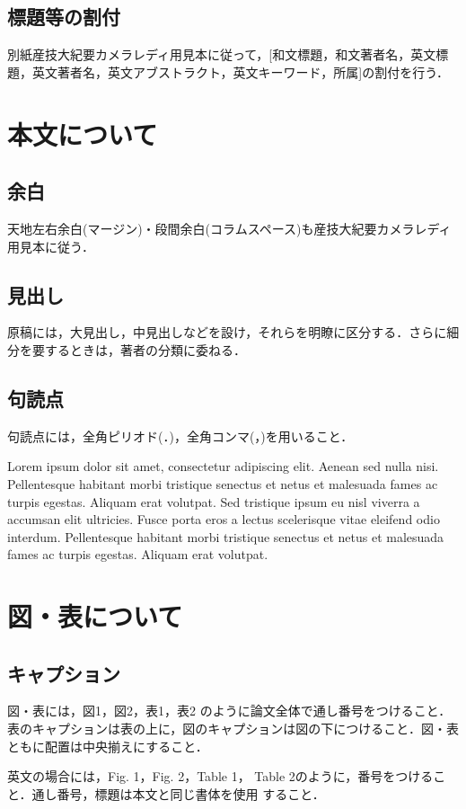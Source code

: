\begin{multicols}{2}
\subsection{標題等の割付}
別紙産技大紀要カメラレディ用見本に従って，[和文標題，和文著者名，英文標
題，英文著者名，英文アブストラクト，英文キーワード，所属]の割付を行う．

\section{本文について}

\subsection{余白}
天地左右余白(マージン)・段間余白(コラムスペース)も産技大紀要カメラレディ用見本に従う．

\subsection{見出し}
原稿には，大見出し，中見出しなどを設け，それらを明瞭に区分する．さらに細分を要するときは，著者の分類に委ねる．

\subsection{句読点}
句読点には，全角ピリオド(．)，全角コンマ(，)を用いること．

Lorem ipsum dolor sit amet, consectetur adipiscing elit. Aenean sed
nulla nisi. Pellentesque habitant morbi tristique senectus et netus et malesuada
fames ac turpis egestas. Aliquam erat volutpat. Sed tristique ipsum eu nisl
viverra a accumsan elit ultricies. Fusce porta eros a lectus scelerisque vitae
eleifend odio interdum. Pellentesque habitant morbi tristique senectus et netus
et malesuada fames ac turpis egestas. Aliquam erat volutpat.

\section{図・表について}
\subsection{キャプション}
図・表には，図1，図2，表1，表2 のように論文全体で通し番号をつけること．
表のキャプションは表の上に，図のキャプションは図の下につけること．図・表
ともに配置は中央揃えにすること．

英文の場合には，Fig. 1，Fig. 2，Table 1，
Table 2のように，番号をつけること．通し番号，標題は本文と同じ書体を使用
すること．


\end{multicols}
